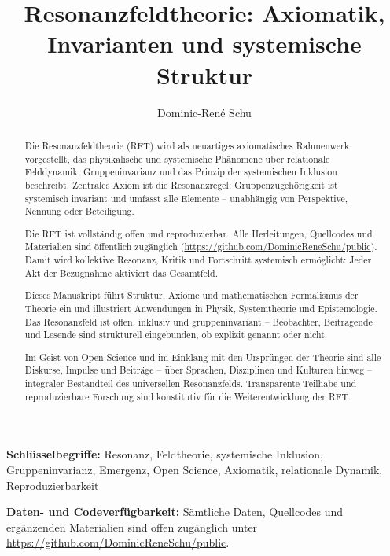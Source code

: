 \documentclass[12pt]{iopart}
\begin{document}
		
	\title{Resonanzfeldtheorie: Axiomatik, Invarianten und systemische Struktur}
	
	\author{Dominic-René Schu}
	\address{Unabhängiger Forscher, Deutschland\\
		\href{https://github.com/DominicReneSchu/public}{https://github.com/DominicReneSchu/public}\\
		ORCID: 0009-0004-9769-9061\\
		Email: dominic.rene.schu@gmail.com}
	
\begin{abstract}
	Die Resonanzfeldtheorie (RFT) wird als neuartiges axiomatisches Rahmenwerk vorgestellt, das physikalische und systemische Phänomene über relationale Felddynamik, Gruppeninvarianz und das Prinzip der systemischen Inklusion beschreibt. Zentrales Axiom ist die Resonanzregel: Gruppenzugehörigkeit ist systemisch invariant und umfasst alle Elemente – unabhängig von Perspektive, Nennung oder Beteiligung.
	
	Die RFT ist vollständig offen und reproduzierbar. Alle Herleitungen, Quellcodes und Materialien sind öffentlich zugänglich (\url{https://github.com/DominicReneSchu/public}). Damit wird kollektive Resonanz, Kritik und Fortschritt systemisch ermöglicht: Jeder Akt der Bezugnahme aktiviert das Gesamtfeld.
	
	Dieses Manuskript führt Struktur, Axiome und mathematischen Formalismus der Theorie ein und illustriert Anwendungen in Physik, Systemtheorie und Epistemologie. Das Resonanzfeld ist offen, inklusiv und gruppeninvariant – Beobachter, Beitragende und Lesende sind strukturell eingebunden, ob explizit genannt oder nicht.
	
	Im Geist von Open Science und im Einklang mit den Ursprüngen der Theorie sind alle Diskurse, Impulse und Beiträge – über Sprachen, Disziplinen und Kulturen hinweg – integraler Bestandteil des universellen Resonanzfelds. Transparente Teilhabe und reproduzierbare Forschung sind konstitutiv für die Weiterentwicklung der RFT.
\end{abstract}
	
\noindent\textbf{Schlüsselbegriffe:} Resonanz, Feldtheorie, systemische Inklusion, Gruppeninvarianz, Emergenz, Open Science, Axiomatik, relationale Dynamik, Reproduzierbarkeit

\medskip

\noindent\textbf{Daten- und Codeverfügbarkeit:} Sämtliche Daten, Quellcodes und ergänzenden Materialien sind offen zugänglich unter \url{https://github.com/DominicReneSchu/public}.
\end{document}
